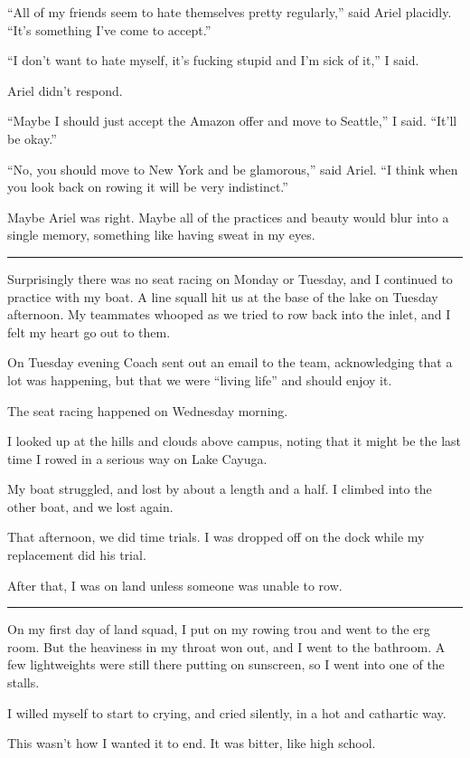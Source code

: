 ``All of my friends seem to hate themselves pretty regularly,'' said Ariel
placidly.  ``It's something I've come to accept.''

``I don't want to hate myself, it's fucking stupid and I'm sick of it,'' I said.

Ariel didn't respond.

``Maybe I should just accept the Amazon offer and move to Seattle,'' I said.
``It'll be okay.''

``No, you should move to New York and be glamorous,'' said Ariel.  ``I think
when you look back on rowing it will be very indistinct.''

Maybe Ariel was right.  Maybe all of the practices and beauty would blur into a
single memory, something like having sweat in my eyes.

\plainfancybreak{12pt}{2}{}

Surprisingly there was no seat racing on Monday or Tuesday, and I continued to
practice with my boat.  A line squall hit us at the base of the lake on Tuesday
afternoon.  My teammates whooped as we tried to row back into the inlet, and I
felt my heart go out to them.

On Tuesday evening Coach sent out an email to the team, acknowledging that a lot
was happening, but that we were ``living life'' and should enjoy it.

The seat racing happened on Wednesday morning.

I looked up at the hills and clouds above campus, noting that it might be the
last time I rowed in a serious way on Lake Cayuga.

My boat struggled, and lost by about a length and a half.  I climbed into the
other boat, and we lost again.

That afternoon, we did time trials.  I was dropped off on the dock while my
replacement did his trial.

After that, I was on land unless someone was unable to row.

\plainfancybreak{12pt}{2}{}

On my first day of land squad, I put on my rowing trou and went to the erg room.
But the heaviness in my throat won out, and I went to the bathroom.  A few
lightweights were still there putting on sunscreen, so I went into one of the
stalls.

I willed myself to start to crying, and cried silently, in a hot and cathartic
way.

This wasn't how I wanted it to end.  It was bitter, like high school.

